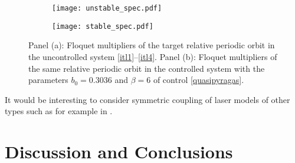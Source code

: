 \documentclass{article}
\begin{document}
\begin{figure}[H]
\begin{center}
\begin{subfigure}[b]{0.49\columnwidth}
\texttt{[image: unstable\_spec.pdf]}
\label{fig:unst}
\caption{}
\end{subfigure}\hfill
\begin{subfigure}[b]{0.49\columnwidth}
\texttt{[image: stable\_spec.pdf]}
\label{fig:st}
\caption{}
\end{subfigure}
\end{center}
\caption{Panel (a): Floquet multipliers of the target relative periodic orbit in the uncontrolled system \eqref{itl1}--\eqref{itl4}. Panel (b): Floquet multipliers of the same relative periodic orbit in the controlled system with the parameters $b_0 = 0.3036$ and $\beta = 6$ of control \eqref{quasipyragas}.}
\label{fig:s1:spectrum}
\end{figure}

It would be interesting to consider symmetric coupling of laser models of other types such as for example in \cite{0,1,2,3,4,5}.

\section{Discussion and Conclusions}
\end{document}
